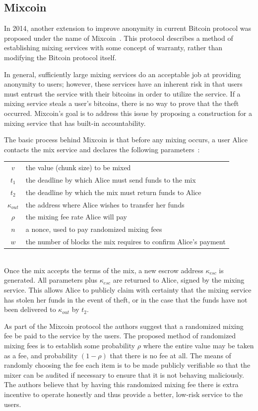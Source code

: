 \documentclass[11pt]{article}
\begin{document}
\subsection{Mixcoin}
In 2014, another extension to improve anonymity in current Bitcoin protocol was proposed under the name of
Mixcoin~\cite{bonneau14}. This protocol describes a method of establishing mixing services with some concept of
warranty, rather than modifying the Bitcoin protocol itself.

In general, sufficiently large mixing services do an acceptable job at providing anonymity to users; however, these
services have an inherent risk in that users must entrust the service with their bitcoins in order to utilize the
service.  If a mixing service steals a user's bitcoins, there is no way to prove that the theft occurred. Mixcoin's goal
is to address this issue by proposing a construction for a mixing service that has built-in accountability.

The basic process behind Mixcoin is that before any mixing occurs, a user Alice contacts the mix service and declares
the following parameters~\cite{bonneau14}:\\
\begin{tabular}{cl}
    $v$ & the value (chunk size) to be mixed\\
    $t_1$ & the deadline by which Alice must send funds to the mix\\
    $t_2$ & the deadline by which the mix must return funds to Alice\\
    $\kappa_{out}$ & the address where Alice wishes to transfer her funds\\
    $\rho$ & the mixing fee rate Alice will pay\\
    $n$ & a nonce, used to pay randomized mixing fees\\
    $w$ & the number of blocks the mix requires to confirm Alice's payment
\end{tabular}
\vspace{1em}\\ 
Once the mix accepts the terms of the mix, a new escrow address $\kappa_{esc}$ is generated. All parameters plus
$\kappa_{esc}$ are returned to Alice, signed by the mixing service. This allows Alice to publicly claim with certainty
that the mixing service has stolen her funds in the event of theft, or in the case that the funds have not been
delivered to $\kappa_{out}$ by $t_2$.

As part of the Mixcoin protocol the authors suggest that a randomized mixing fee be paid to the service by the users.
The proposed method of randomized mixing fees is to establish some probability $\rho$ where the entire value may be
taken as a fee, and probability $(1 - \rho)$ that there is no fee at all. The means of randomly choosing the fee each
item is to be made publicly verifiable so that the mixer can be audited if necessary to ensure that it is not behaving
maliciously. The authors believe that by having this randomized mixing fee there is extra incentive to operate honestly
and thus provide a better, low-risk service to the users.
\end{document}
